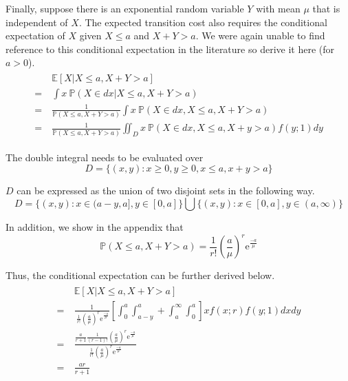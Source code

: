 Finally, suppose there is an exponential random variable $Y$ with mean $\mu$ that is independent of $X$. The expected transition cost also requires the conditional expectation of $X$ given $X \leq a$ and $X + Y > a$. We were again unable to find reference to this conditional expectation in the literature so derive it here (for $a > 0$).
\begin{align}
	\begin{split}
		& \ \mathbb{E} [X | X \leq a, X + Y > a] \\
		= & \ \int x \ \mathbb{P} (X \in d x | X \leq a, X + Y > a) \\
		= & \ \frac{1}{\mathbb{P} (X \leq a, X + Y > a)} \int x \ \mathbb{P} (X \in d x, X \leq a, X + Y > a) \\
		= & \ \frac{1}{\mathbb{P} (X \leq a, X + Y > a)} \iint_{D} x \ \mathbb{P} (X \in d x, X \leq a, X + y > a) f (y; 1) d y
	\end{split}
\end{align}

The double integral needs to be evaluated over
\begin{equation}
	D = \Big\{ (x, y) : x \geq 0, y \geq 0, x \leq a, x + y > a \Big\}
\end{equation}

$D$ can be expressed as the union of two disjoint sets in the following way.
\begin{equation}
	D = \Big\{ (x, y) : x \in (a - y, a], y \in [0, a] \Big\} \bigcup \Big\{ (x, y) : x \in [0, a], y \in (a, \infty) \Big\}
\end{equation}

In addition, we show in the appendix that
\begin{equation}
	\mathbb{P} (X \leq a, X + Y > a) = \frac{1}{r!} \left( \frac{a}{\mu} \right)^{r} \mathrm{e}^{\frac{-a}{\mu}}
\end{equation}

Thus, the conditional expectation can be further derived below.
\begin{align}
	\begin{split}
		& \ \mathbb{E} [X | X \leq a, X + Y > a] \\
		= & \ \frac{1}{\ \frac{1}{r!} \left( \frac{a}{\mu} \right)^{r} \mathrm{e}^{\frac{-a}{\mu}}} \left[ \int_{0}^{a} \int_{a - y}^{a} + \int_{a}^{\infty} \int_{0}^{a} \right] x f (x; r) f (y; 1) d x d y \\
		= & \ \frac{\frac{a}{r + 1} \frac{1}{(r - 1)!} \left( \frac{a}{\mu} \right)^{r} \mathrm{e}^{\frac{-a}{\mu}}}{\frac{1}{r!} \left( \frac{a}{\mu} \right)^{r} \mathrm{e}^{\frac{-a}{\mu}}} \\
		= & \ \frac{a r}{r + 1}
	\end{split}
\end{align}

